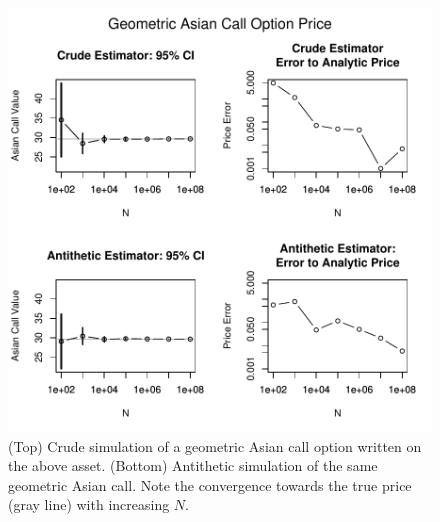 \documentclass[12pt]{article}
\begin{document}
{\footnotesize
{}
}

\begin{figure}[H]
	\centering
 	\includegraphics[scale=1]{../plots/q3/geo_asian_call_sim_est.pdf}
\caption{(Top) Crude simulation of a geometric Asian call option written on the above asset. (Bottom) Antithetic simulation of the same geometric Asian call. Note the convergence towards the true price (gray line) with increasing $N$.}
\label{fig:geo_asian_call_sim}
\end{figure}
\end{document}

